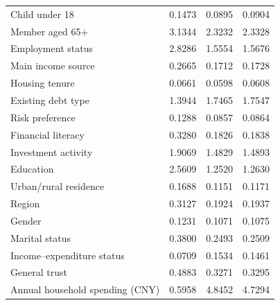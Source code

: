 \documentclass[10pt]{article}
\begin{document}
\begin{center}
\begin{minipage}{\textwidth}
\begin{tabularx}{\textwidth}{@{}Xrrr@{}}
Child under 18 & 0.1473 & 0.0895 & 0.0904 \\

Member aged 65+ & 3.1344 & 2.3232 & 2.3328 \\

Employment status & 2.8286 & 1.5554 & 1.5676 \\

Main income source & 0.2665 & 0.1712 & 0.1728 \\

Housing tenure & 0.0661 & 0.0598 & 0.0608 \\

Existing debt type & 1.3944 & 1.7465 & 1.7547 \\

Risk preference & 0.1288 & 0.0857 & 0.0864 \\

Financial literacy & 0.3280 & 0.1826 & 0.1838 \\

Investment activity & 1.9069 & 1.4829 & 1.4893 \\

Education & 2.5609 & 1.2520 & 1.2630 \\

Urban/rural residence & 0.1688 & 0.1151 & 0.1171 \\

Region & 0.3127 & 0.1924 & 0.1937 \\

Gender & 0.1231 & 0.1071 & 0.1075 \\

Marital status & 0.3800 & 0.2493 & 0.2509 \\

Income--expenditure status & 0.0709 & 0.1534 & 0.1461 \\

General trust & 0.4883 & 0.3271 & 0.3295 \\

Annual household spending (CNY) & 0.5958 & 4.8452 & 4.7294 \\

\bottomrule\end{tabularx}
\par{}
\end{minipage}\end{center}
\end{document}
